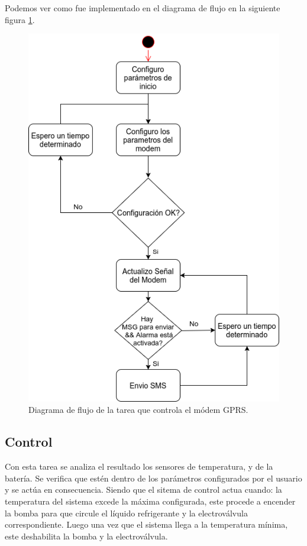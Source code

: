 Podemos ver como fue implementado en el diagrama de flujo en la siguiente figura \ref{fig:modem_task}.

\begin{figure}[!hp]
  \centering
  \includegraphics[scale=.5]{./Figures/modem_task.png}
  \caption{Diagrama de flujo de la tarea que controla el módem GPRS.}
  \label{fig:modem_task}
\end{figure}


\subsection*{Control}
Con esta tarea se analiza el resultado los sensores de temperatura, y de la batería. Se verifica que estén dentro de los parámetros configurados por el usuario y se actúa en consecuencia. Siendo que el sitema de control actua cuando: la temperatura del sistema excede la máxima configurada, este procede a encender la bomba para que circule el líquido refrigerante y la electroválvula correspondiente. Luego una vez que el sistema llega a la temperatura mínima, este deshabilita la bomba y la electroválvula.

